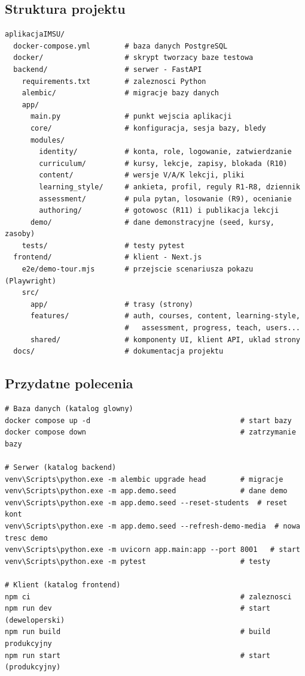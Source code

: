 \subsection{Struktura projektu}

\begin{lstlisting}
aplikacjaIMSU/
  docker-compose.yml        # baza danych PostgreSQL
  docker/                   # skrypt tworzacy baze testowa
  backend/                  # serwer - FastAPI
    requirements.txt        # zaleznosci Python
    alembic/                # migracje bazy danych
    app/
      main.py               # punkt wejscia aplikacji
      core/                 # konfiguracja, sesja bazy, bledy
      modules/
        identity/           # konta, role, logowanie, zatwierdzanie
        curriculum/         # kursy, lekcje, zapisy, blokada (R10)
        content/            # wersje V/A/K lekcji, pliki
        learning_style/     # ankieta, profil, reguly R1-R8, dziennik
        assessment/         # pula pytan, losowanie (R9), ocenianie
        authoring/          # gotowosc (R11) i publikacja lekcji
      demo/                 # dane demonstracyjne (seed, kursy, zasoby)
    tests/                  # testy pytest
  frontend/                 # klient - Next.js
    e2e/demo-tour.mjs       # przejscie scenariusza pokazu (Playwright)
    src/
      app/                  # trasy (strony)
      features/             # auth, courses, content, learning-style,
                            #   assessment, progress, teach, users...
      shared/               # komponenty UI, klient API, uklad strony
  docs/                     # dokumentacja projektu
\end{lstlisting}

\subsection{Przydatne polecenia}

\begin{lstlisting}
# Baza danych (katalog glowny)
docker compose up -d                                   # start bazy
docker compose down                                    # zatrzymanie bazy

# Serwer (katalog backend)
venv\Scripts\python.exe -m alembic upgrade head        # migracje
venv\Scripts\python.exe -m app.demo.seed               # dane demo
venv\Scripts\python.exe -m app.demo.seed --reset-students  # reset kont
venv\Scripts\python.exe -m app.demo.seed --refresh-demo-media  # nowa tresc demo
venv\Scripts\python.exe -m uvicorn app.main:app --port 8001   # start
venv\Scripts\python.exe -m pytest                      # testy

# Klient (katalog frontend)
npm ci                                                 # zaleznosci
npm run dev                                            # start (deweloperski)
npm run build                                          # build produkcyjny
npm run start                                          # start (produkcyjny)
\end{lstlisting}

